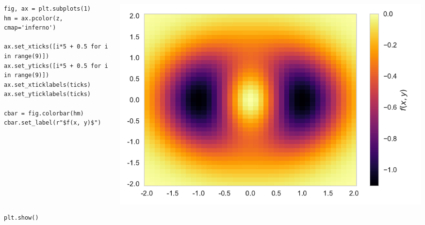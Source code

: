 \documentclass{beamer}
\begin{document}
\begin{frame}[fragile]
\tiny{
\begin{columns}
\begin{column}{0.45\textwidth}
\begin{verbatim}
fig, ax = plt.subplots(1)
hm = ax.pcolor(z, cmap='inferno')

ax.set_xticks([i*5 + 0.5 for i in range(9)])
ax.set_yticks([i*5 + 0.5 for i in range(9)])
ax.set_xticklabels(ticks)
ax.set_yticklabels(ticks)

cbar = fig.colorbar(hm)
cbar.set_label(r"$f(x, y)$")









plt.show()
\end{verbatim}
\end{column}
\begin{column}{0.55\textwidth}
\includegraphics[width=\textwidth]{../heatmap_5.pdf}
\end{column}
\end{columns}
}
\end{frame}
\end{document}
